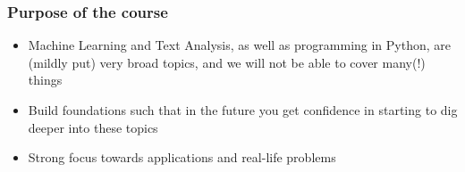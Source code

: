 \documentclass[compress, aspectratio=54]{beamer}
\begin{document}
\begin{frame}
\frametitle{Purpose of the course}
\begin{itemize}

\item Machine Learning and  Text Analysis, as well as programming in Python, are (mildly put) very broad topics, and we will not be able to cover many(!) things
\item Build foundations such that in the future you get confidence in starting to dig deeper into these topics
 \item Strong focus towards applications and real-life problems
\end{itemize}
\end{frame}
\end{document}
